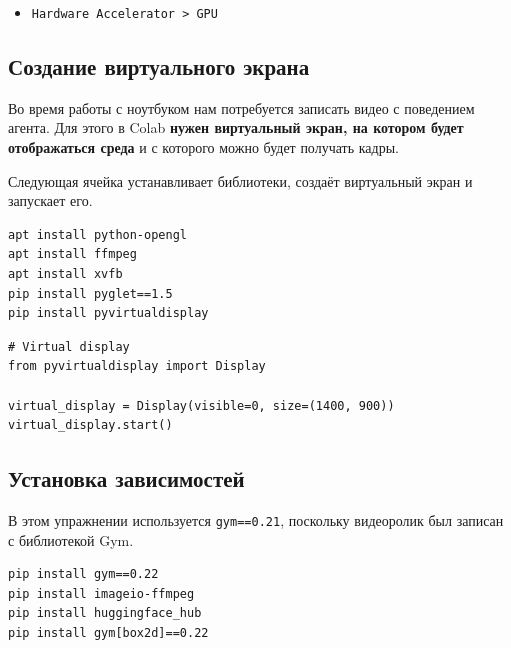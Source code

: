\documentclass[11pt,a4paper]{article}
\begin{document}

\begin{itemize}
\tightlist
\item
  \texttt{Hardware\ Accelerator\ \textgreater{}\ GPU}
\end{itemize}


\subsection{Создание виртуального экрана}\label{create-a-virtual-display}

Во время работы с ноутбуком нам потребуется записать видео с поведением агента. Для этого в Colab \textbf{нужен виртуальный экран, на котором будет отображаться среда} и с которого можно будет получать кадры.

Следующая ячейка устанавливает библиотеки, создаёт виртуальный экран и запускает его.

\begin{lstlisting}
apt install python-opengl
apt install ffmpeg
apt install xvfb
pip install pyglet==1.5
pip install pyvirtualdisplay
\end{lstlisting}

\begin{lstlisting}
# Virtual display
from pyvirtualdisplay import Display

virtual_display = Display(visible=0, size=(1400, 900))
virtual_display.start()
\end{lstlisting}

\subsection{Установка зависимостей}\label{install-dependencies}

В этом упражнении используется \texttt{gym==0.21}, поскольку видеоролик был записан с библиотекой Gym.

\begin{lstlisting}
pip install gym==0.22
pip install imageio-ffmpeg
pip install huggingface_hub
pip install gym[box2d]==0.22
\end{lstlisting}
\end{document}
